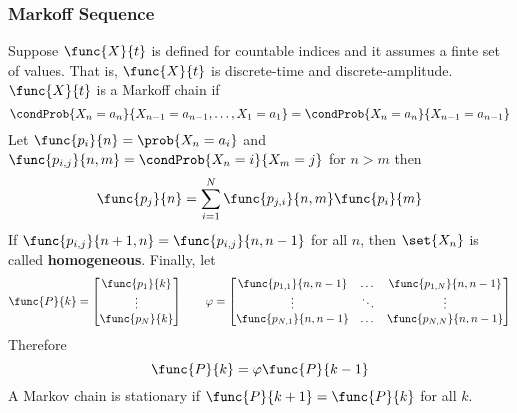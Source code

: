 \subsubsection{Markoff Sequence}
Suppose \(\func{X}{t}\) is defined for countable indices and it assumes a finte set of values. That is, \(\func{X}{t}\) is discrete-time and discrete-amplitude. \(\func{X}{t}\) is a Markoff chain if 
\begin{equation*}
    \condProb{X_n = a_n}{X_{n-1} = a_{n-1} , \dots , X_1 = a_1} = \condProb{X_{n} = a_n}{X_{n-1}  = a_{n-1}}
\end{equation*}
Let \(\func{p_i}{n} = \prob{X_n = a_i}\) and \(\func{p_{i,j}}{n,m} = \condProb{X_n = i}{X_m = j}\) for \(n > m\) then 
\begin{equation*}
    \func{p_j}{n} = \sum_{i = 1}^N \func{p_{j,i}}{n,m} \func{p_i}{m}
\end{equation*}
If \(\func{p_{i,j}}{n+1,n} = \func{p_{i,j}}{n ,n-1}\) for all \(n\), then \(\set{X_n}\) is called \textbf{homogeneous}. Finally, let 
\begin{equation*}
    \func{P}{k} = \begin{bmatrix}
        \func{p_1}{k} \\
        \vdots \\
        \func{p_N}{k}
    \end{bmatrix}
    \qquad 
    \varphi = \begin{bmatrix}
        \func{p_{1,1}}{n,n - 1} & \dots & \func{p_{1,N}}{n,n- 1}\\
        \vdots & \ddots & \vdots \\
        \func{p_{N,1}}{n,n - 1} & \dots & \func{p_{N,N}}{n,n- 1}
    \end{bmatrix}
\end{equation*}
Therefore 
\begin{equation*}
    \func{P}{k} = \varphi \func{P}{k- 1}
\end{equation*}
A Markov chain is stationary if \(\func{P}{k+1} = \func{P}{k}\) for all \(k\).

